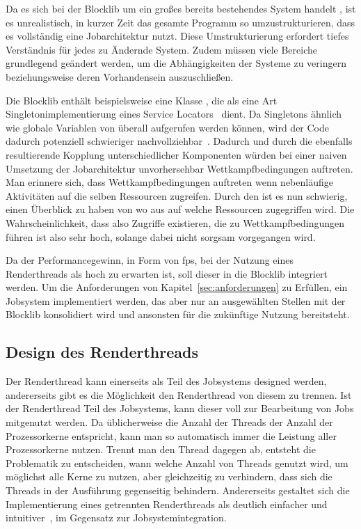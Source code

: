 Da es sich bei der Blocklib um ein großes bereits bestehendes System handelt , ist es unrealistisch, in kurzer Zeit das gesamte Programm so umzustrukturieren, dass es vollständig eine Jobarchitektur nutzt. Diese Umstrukturierung erfordert tiefes Verständnis für jedes zu Ändernde System. Zudem müssen viele Bereiche grundlegend geändert werden, um die Abhängigkeiten der Systeme zu veringern beziehungsweise deren Vorhandensein auszuschließen.

Die Blocklib enthält beispielsweise eine Klasse , die als eine Art Singletonimplementierung eines Service Locators~\cite[S.~301~ff.]{Nystrom2015} dient. Da Singletons ähnlich wie globale Variablen von überall aufgerufen werden können, wird der Code dadurch potenziell schwieriger nachvollziehbar~\cite[S.~108]{Nystrom2015}. Dadurch und durch die ebenfalls resultierende Kopplung unterschiedlicher Komponenten würden bei einer naiven Umsetzung der Jobarchitektur unvorhersehbar Wettkampfbedingungen auftreten.
Man erinnere sich, dass Wettkampfbedingungen auftreten wenn nebenläufige Aktivitäten auf die selben Ressourcen zugreifen. Durch den  ist es nun schwierig, einen Überblick zu haben von wo aus auf welche Ressourcen zugegriffen wird. Die Wahrscheinlichkeit, dass also Zugriffe existieren, die zu Wettkampfbedingungen führen ist also sehr hoch, solange dabei nicht sorgsam vorgegangen wird.

Da der Performancegewinn, in Form von \ac{fps}, bei der Nutzung eines Renderthreads als hoch zu erwarten ist, soll dieser in die Blocklib integriert werden. Um die Anforderungen von Kapitel~\ref{sec:anforderungen} zu Erfüllen, ein Jobsystem implementiert werden, das aber nur an ausgewählten Stellen mit der Blocklib konsolidiert wird und ansonsten für die zukünftige Nutzung bereitsteht.

\subsection{Design des Renderthreads}
Der Renderthread kann einerseits als Teil des Jobsystems designed werden, andererseits gibt es die Möglichkeit den Renderthread von diesem zu trennen. Ist der Renderthread Teil des Jobsystems, kann dieser voll zur Bearbeitung von Jobs mitgenutzt werden. Da üblicherweise die Anzahl der Threads der Anzahl der Prozessorkerne entspricht, kann man so automatisch immer die Leistung aller Prozessorkerne nutzen. Trennt man den Thread dagegen ab, entsteht die Problematik zu entscheiden, wann welche Anzahl von Threads genutzt wird, um möglichst alle Kerne zu nutzen, aber gleichzeitig zu verhindern, dass sich die Threads in der Ausführung gegenseitig behindern. Andererseits gestaltet sich die Implementierung eines getrennten Renderthreads als deutlich einfacher und intuitiver~\cite{Tatarchuk2014}, im Gegensatz zur Jobsystemintegration.

